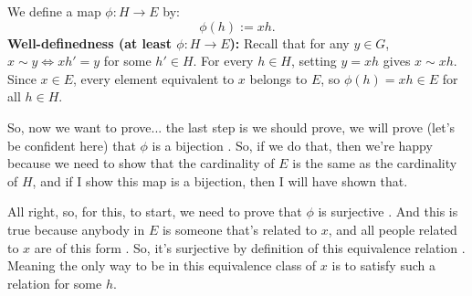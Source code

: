 \begin{proofWrapper}
\begin{content}
\begin{center}
\end{center}

We define a map $\phi \colon H \to E$ by:
\[
\phi(h) := xh.
\]
\textbf{Well-definedness (at least $\phi \colon H \to E$):} Recall that for any $y \in G$, $x \sim y \iff xh' = y$ for some $h' \in H$. For every $h \in H$, setting $y = xh$ gives $x \sim xh$. Since $x \in E$, every element equivalent to $x$ belongs to $E$, so $\phi(h) = xh \in E$ for all $h \in H$.
\end{content}

\begin{hidden}
\end{hidden}

\begin{speech}[00:24:43 - 00:26:58]
So, now we want to prove... the last step is we should prove, we will prove (let's be confident here) that $\phi$ is a bijection . So, if we do that, then we're happy because we need to show that the cardinality of $E$ is the same as the cardinality of $H$, and if I show this map is a bijection, then I will have shown that.

All right, so, for this, to start, we need to prove that $\phi$ is surjective . And this is true because anybody in $E$ is someone that's related to $x$, and all people related to $x$ are of this form . So, it's surjective by definition of this equivalence relation . Meaning the only way to be in this equivalence class of $x$ is to satisfy such a relation for some $h$.


\end{speech}
\end{proofWrapper}
